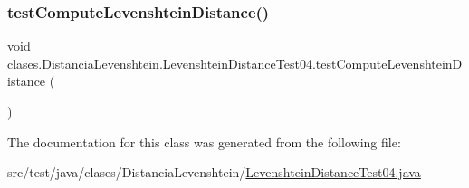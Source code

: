 \subsubsection{\texorpdfstring{test\+Compute\+Levenshtein\+Distance()}{testComputeLevenshteinDistance()}}
{\footnotesize\ttfamily void clases.\+Distancia\+Levenshtein.\+Levenshtein\+Distance\+Test04.\+test\+Compute\+Levenshtein\+Distance (\begin{DoxyParamCaption}{ }\end{DoxyParamCaption})}



The documentation for this class was generated from the following file\+:\begin{DoxyCompactItemize}
\item 
src/test/java/clases/\+Distancia\+Levenshtein/\hyperlink{_levenshtein_distance_test04_8java}{Levenshtein\+Distance\+Test04.\+java}\end{DoxyCompactItemize}
